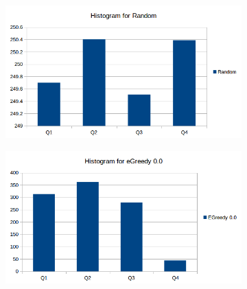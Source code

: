 \documentclass[a4paper, 11pt]{article}
\begin{document}
\begin{figure}[H]
\centering
\begin{subfigure}{.5\textwidth}
  \centering
  \includegraphics[width=1\linewidth]{ex1_2_histogram_random}
\end{subfigure}%
\begin{subfigure}{.5\textwidth}
  \centering
  \includegraphics[width=1\linewidth]{ex1_2_histogram_egreedy00}
\end{subfigure}%


\end{figure}
\end{document}
